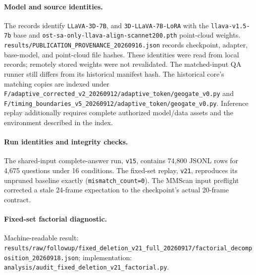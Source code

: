 \paragraph{Model and source identities.} The records identify \texttt{LLaVA-3D-7B}, and \texttt{3D-LLaVA-7B-LoRA} with the \texttt{llava-v1.5-7b} base and \nolinkurl{ost-sa-only-llava-align-scannet200.pth} point-cloud weights. \nolinkurl{results/PUBLICATION_PROVENANCE_20260916.json} records checkpoint, adapter, base-model, and point-cloud file hashes. These identities were read from local records; remotely stored weights were not revalidated. The matched-input QA runner still differs from its historical manifest hash. The historical core's matching copies are indexed under \nolinkurl{F/adaptive_corrected_v2_20260912/adaptive_token/geogate_v0.py} and \nolinkurl{F/timing_boundaries_v5_20260912/adaptive_token/geogate_v0.py}. Inference replay additionally requires complete authorized model/data assets and the environment described in the index.


\paragraph{Run identities and integrity checks.} The shared-input complete-answer run, \texttt{v15}, contains 74,800 JSONL rows for 4,675 questions under 16 conditions. The fixed-set replay, \texttt{v21}, reproduces its unpruned baseline exactly (\texttt{mismatch\_count=0}). The MMScan input preflight corrected a stale 24-frame expectation to the checkpoint's actual 20-frame contract.

\paragraph{Fixed-set factorial diagnostic.} Machine-readable result: \texttt{results/raw/followup/}\allowbreak \texttt{fixed\_deletion\_v21\_full\_20260917/}\allowbreak \texttt{factorial\_decomposition\_20260918.json}; implementation: \texttt{analysis/}\allowbreak \texttt{audit\_fixed\_deletion\_v21\_factorial.py}.
